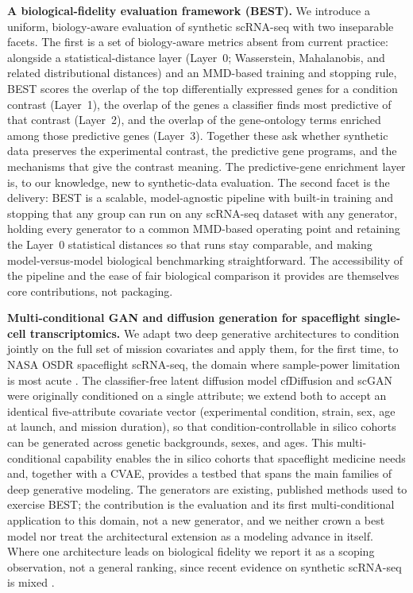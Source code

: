 \documentclass[11pt]{article}
\newcommand{\fides}{BEST}
\begin{document}
\noindent\textbf{A biological-fidelity evaluation framework (\fides{}).} We introduce a uniform, biology-aware evaluation of synthetic scRNA-seq with two inseparable facets. The first is a set of biology-aware metrics absent from current practice: alongside a statistical-distance layer (Layer~0; Wasserstein, Mahalanobis, and related distributional distances) and an MMD-based training and stopping rule, \fides{} scores the overlap of the top differentially expressed genes for a condition contrast (Layer~1), the overlap of the genes a classifier finds most predictive of that contrast (Layer~2), and the overlap of the gene-ontology terms enriched among those predictive genes (Layer~3). Together these ask whether synthetic data preserves the experimental contrast, the predictive gene programs, and the mechanisms that give the contrast meaning. The predictive-gene enrichment layer is, to our knowledge, new to synthetic-data evaluation. The second facet is the delivery: \fides{} is a scalable, model-agnostic pipeline with built-in training and stopping that any group can run on any scRNA-seq dataset with any generator, holding every generator to a common MMD-based operating point and retaining the Layer~0 statistical distances so that runs stay comparable, and making model-versus-model biological benchmarking straightforward. The accessibility of the pipeline and the ease of fair biological comparison it provides are themselves core contributions, not packaging.

\noindent\textbf{Multi-conditional GAN and diffusion generation for spaceflight single-cell transcriptomics.} We adapt two deep generative architectures to condition jointly on the full set of mission covariates and apply them, for the first time, to NASA OSDR spaceflight scRNA-seq, the domain where sample-power limitation is most acute \cite{scott,ilangovan}. The classifier-free latent diffusion model cfDiffusion \cite{cfdiffusion} and scGAN \cite{scgan} were originally conditioned on a single attribute; we extend both to accept an identical five-attribute covariate vector (experimental condition, strain, sex, age at launch, and mission duration), so that condition-controllable in silico cohorts can be generated across genetic backgrounds, sexes, and ages. This multi-conditional capability enables the in silico cohorts that spaceflight medicine needs and, together with a CVAE, provides a testbed that spans the main families of deep generative modeling. The generators are existing, published methods used to exercise \fides{}; the contribution is the evaluation and its first multi-conditional application to this domain, not a new generator, and we neither crown a best model nor treat the architectural extension as a modeling advance in itself. Where one architecture leads on biological fidelity we report it as a scoping observation, not a general ranking, since recent evidence on synthetic scRNA-seq is mixed \cite{cfgen,scgft,scdiffusion}.
\end{document}
